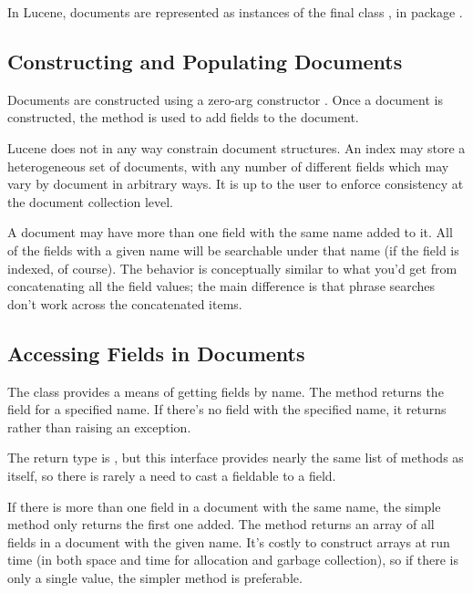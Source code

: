 In Lucene, documents are represented as instances of the final class
, in package .

\subsection{Constructing and Populating Documents} 

Documents are constructed using a zero-arg constructor
.  Once a document is constructed, the method
 is used to add fields to the document.

Lucene does not in any way constrain document structures.  An index
may store a heterogeneous set of documents, with any number of
different fields which may vary by document in arbitrary ways.  It is
up to the user to enforce consistency at the document collection
level.  

A document may have more than one field with the same name added to
it.  All of the fields with a given name will be searchable under that
name (if the field is indexed, of course).  The behavior is
conceptually similar to what you'd get from concatenating all the
field values; the main difference is that phrase searches
don't work across the concatenated items.

\subsection{Accessing Fields in Documents}

The  class provides a means of getting fields by name.
The method  returns the field for a
specified name.  If there's no field with the specified name, it
returns  rather than raising an exception.

The return type is , but this interface provides
nearly the same list of methods as  itself, so there is
rarely a need to cast a fieldable to a field.  

If there is more than one field in a document with the same name, the
simple method  only returns the first one
added.  The method  returns an array of
all fields in a document with the given name.  It's costly to
construct arrays at run time (in both space and time for allocation
and garbage collection), so if there is only a single value, the
simpler method is preferable.


